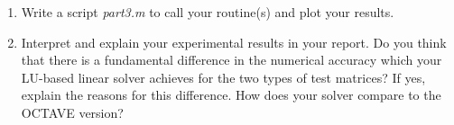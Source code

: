 \documentclass{scrartcl}
\begin{document}
\begin{enumerate}
        \item Write a script \textit{part3.m} to call your routine(s) and plot your results. 
            
        \item Interpret and explain your experimental results in your report. Do you think that there is a fundamental difference in the numerical accuracy which your LU-based linear solver achieves for the two types of test matrices? If yes, explain the reasons for this difference. How does your solver compare to the OCTAVE version?
    \end{enumerate}
\end{document}
